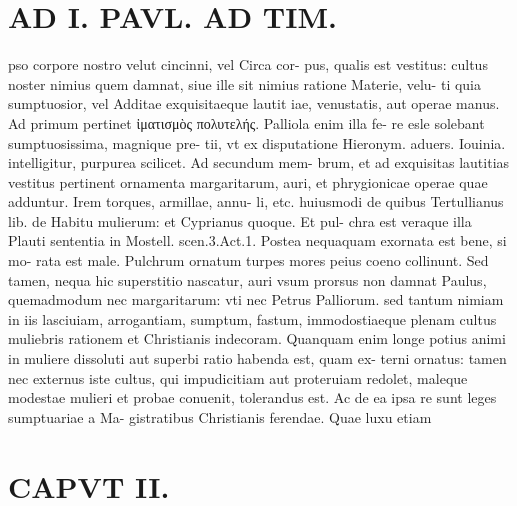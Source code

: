 \documentclass{article}
\begin{document}
\begin{pages}
\section*{AD I. PAVL. AD TIM. }
\marginpar{[ p.80 ]}\pstart pso corpore nostro velut cincinni, vel Circa cor- pus, qualis est vestitus: cultus noster nimius quem damnat, siue ille sit nimius ratione Materie, velu- ti quia sumptuosior, vel Additae exquisitaeque lautit iae, venustatis, aut operae manus. Ad primum pertinet ἰματισμὸς πολυτελής. Palliola enim illa fe- re esle solebant sumptuosissima, magnique pre- tii, vt ex disputatione Hieronym. aduers. Iouinia. intelligitur, purpurea scilicet. Ad secundum mem- brum, et ad exquisitas lautitias vestitus pertinent ornamenta margaritarum, auri, et phrygionicae operae quae adduntur. Irem torques, armillae, annu- li, etc. huiusmodi de quibus Tertullianus lib.  de Habitu mulierum: et Cyprianus quoque. Et pul- chra est veraque illa Plauti sententia in Mostell. scen.3.Act.1. Postea nequaquam exornata est bene, si mo- rata est male. Pulchrum ornatum turpes mores peius coeno collinunt. Sed tamen, nequa hic superstitio nascatur, auri vsum prorsus non damnat Paulus, quemadmodum nec margaritarum: vti nec Petrus Palliorum. sed tantum nimiam in iis lasciuiam, arrogantiam, sumptum, fastum, immodostiaeque plenam cultus muliebris rationem et Christianis indecoram. Quanquam enim longe potius animi in muliere dissoluti aut superbi ratio habenda est, quam ex- terni ornatus: tamen nec externus iste cultus, qui impudicitiam aut proteruiam redolet, maleque modestae mulieri et probae conuenit, tolerandus est. Ac de ea ipsa re sunt leges sumptuariae a Ma- gistratibus Christianis ferendae. Quae luxu etiam  \pend
\section*{CAPVT  II. }
\marginpar{[ p.81 ]}\pstart {}
{}

\end{pages}
\end{document}
